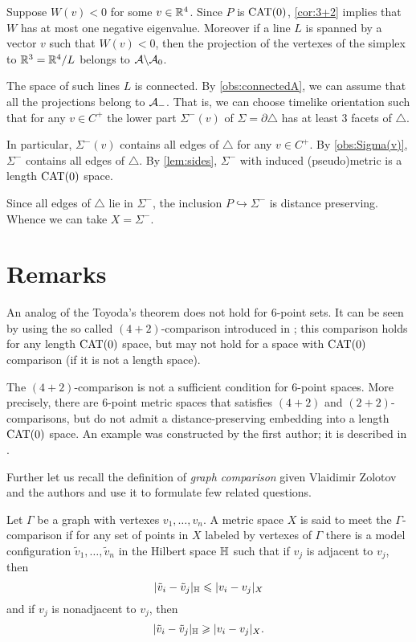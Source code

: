 \documentclass{article}
\begin{document}
Suppose $W(v)<0$ for some $v\in\mathbb{R}^4$.
Since $P$ is $\mathrm{CAT}(0)$, \ref{cor:3+2} implies that $W$ has at most one negative eigenvalue.
Moreover if a line $L$ is spanned by a vector $v$ such that $W(v)<0$, then the projection of the vertexes of the simplex to $\mathbb{R}^3=\mathbb{R}^4/L$ belongs to $\mathcal{A}\backslash\mathcal{A}_0$.

The space of such lines $L$ is connected.
By \ref{obs:connectedA}, we can assume that all the projections belong to $\mathcal{A}_-$.
That is, we can choose timelike orientation such that for any $v\in C^+$ the lower part $\Sigma^-(v)$ of $\Sigma=\partial \triangle$ has at least 3 facets of $\triangle$.

In particular, $\Sigma^-(v)$ contains all edges of $\triangle$ for any $v\in C^+$.
By \ref{obs:Sigma(v)}, $\Sigma^-$ contains all edges of $\triangle$.
By \ref{lem:sides}, $\Sigma^-$ with induced (pseudo)metric is a length $\mathrm{CAT}(0)$ space.

Since all edges of $\triangle$ lie in $\Sigma^-$, the inclusion $P\hookrightarrow \Sigma^-$ is distance preserving.
Whence we can take $X=\Sigma^-$.
\qeds

\section{Remarks}

An analog of the Toyoda's theorem does not hold for 6-point sets.
It can be seen by using the so called $(4{+}2)$-comparison introduced in \cite{alexander-kapovitch-petrunin-2011};
this comparison holds for any length $\mathrm{CAT}(0)$ space, but may not hold for a space with $\mathrm{CAT}(0)$ comparison (if it is not a length space).

{\sloppy

The $(4{+}2)$-comparison is not a sufficient condition for $6$-point spaces.
More precisely, there are 6-point metric spaces that satisfies $(4{+}2)$ and $(2{+}2)$-comparisons, but do not admit a distance-preserving embedding into a length $\mathrm{CAT}(0)$ space.
An example was constructed by the first author; it is described in \cite{alexander-kapovitch-petrunin-2011}.

}

Further let us recall the definition of \emph{graph comparison} given Vlaidimir Zolotov and the authors \cite{lebedeva-petrunin-zolotov} and use it to formulate few related questions.

Let $\Gamma$ be a graph with vertexes $v_1,\dots,v_n$.
A metric space $X$ is said to meet the $\Gamma$-comparison if for any set of points in $X$ labeled by vertexes of $\Gamma$ there is a model configuration $\tilde v_1,\dots,\tilde v_n$ in the Hilbert space $\mathbb H$ such that 
if $v_j$ is adjacent to $v_j$, then
\[|\tilde v_i-\tilde v_j|_{\mathbb H}\leqslant | v_i-v_j|_{X}\]
and
if $v_j$ is nonadjacent to $v_j$, then
\[|\tilde v_i-\tilde v_j|_{\mathbb H}\geqslant | v_i-v_j|_{X}.\]
\end{document}
